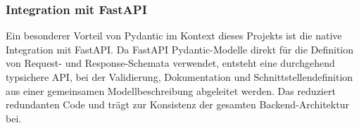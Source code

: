 \subsubsection{Integration mit FastAPI}
Ein besonderer Vorteil von Pydantic im Kontext dieses Projekts ist die native Integration mit FastAPI. Da FastAPI Pydantic-Modelle direkt für die Definition von Request- und Response-Schemata verwendet, entsteht eine durchgehend typsichere API, bei der Validierung, Dokumentation und Schnittstellendefinition aus einer gemeinsamen Modellbeschreibung abgeleitet werden. Das reduziert redundanten Code und trägt zur Konsistenz der gesamten Backend-Architektur bei.